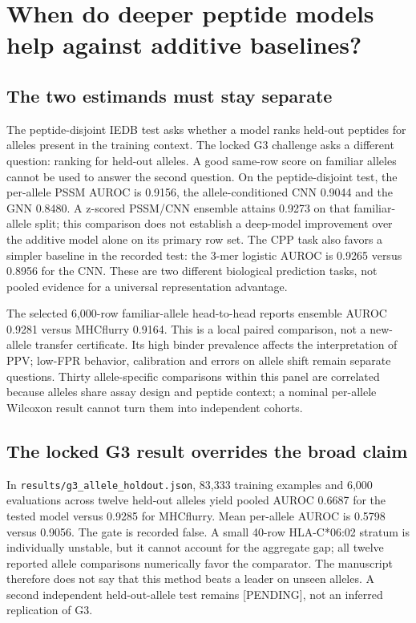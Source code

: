\clearpage
\section{When do deeper peptide models help against additive baselines?}
\subsection{The two estimands must stay separate}
The peptide-disjoint IEDB test asks whether a model ranks held-out peptides for alleles present in the training context. The locked G3 challenge asks a different question: ranking for held-out alleles. A good same-row score on familiar alleles cannot be used to answer the second question. On the peptide-disjoint test, the per-allele PSSM AUROC is 0.9156, the allele-conditioned CNN 0.9044 and the GNN 0.8480. A z-scored PSSM/CNN ensemble attains 0.9273 on that familiar-allele split; this comparison does not establish a deep-model improvement over the additive model alone on its primary row set. The CPP task also favors a simpler baseline in the recorded test: the 3-mer logistic AUROC is 0.9265 versus 0.8956 for the CNN. These are two different biological prediction tasks, not pooled evidence for a universal representation advantage.

The selected 6,000-row familiar-allele head-to-head reports ensemble AUROC 0.9281 versus MHCflurry 0.9164. This is a local paired comparison, not a new-allele transfer certificate. Its high binder prevalence affects the interpretation of PPV; low-FPR behavior, calibration and errors on allele shift remain separate questions. Thirty allele-specific comparisons within this panel are correlated because alleles share assay design and peptide context; a nominal per-allele Wilcoxon result cannot turn them into independent cohorts.

\subsection{The locked G3 result overrides the broad claim}
In \texttt{results/g3\_allele\_holdout.json}, 83,333 training examples and 6,000 evaluations across twelve held-out alleles yield pooled AUROC 0.6687 for the tested model versus 0.9285 for MHCflurry. Mean per-allele AUROC is 0.5798 versus 0.9056. The gate is recorded false. A small 40-row HLA-C*06:02 stratum is individually unstable, but it cannot account for the aggregate gap; all twelve reported allele comparisons numerically favor the comparator. The manuscript therefore does not say that this method beats a leader on unseen alleles. A second independent held-out-allele test remains [PENDING], not an inferred replication of G3.

